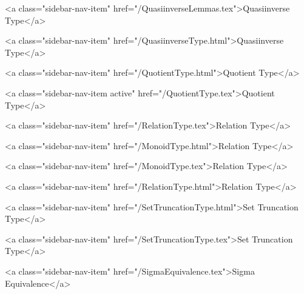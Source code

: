       
    
      
        
          <a class="sidebar-nav-item" href="/QuasiinverseLemmas.tex">Quasiinverse Type</a>
        
      
    
      
        
          <a class="sidebar-nav-item" href="/QuasiinverseType.html">Quasiinverse Type</a>
        
      
    
      
        
          <a class="sidebar-nav-item" href="/QuotientType.html">Quotient Type</a>
        
      
    
      
        
          <a class="sidebar-nav-item active" href="/QuotientType.tex">Quotient Type</a>
        
      
    
      
        
          <a class="sidebar-nav-item" href="/RelationType.tex">Relation Type</a>
        
      
    
      
        
          <a class="sidebar-nav-item" href="/MonoidType.html">Relation Type</a>
        
      
    
      
        
          <a class="sidebar-nav-item" href="/MonoidType.tex">Relation Type</a>
        
      
    
      
        
          <a class="sidebar-nav-item" href="/RelationType.html">Relation Type</a>
        
      
    
      
        
          <a class="sidebar-nav-item" href="/SetTruncationType.html">Set Truncation Type</a>
        
      
    
      
        
          <a class="sidebar-nav-item" href="/SetTruncationType.tex">Set Truncation Type</a>
        
      
    
      
        
          <a class="sidebar-nav-item" href="/SigmaEquivalence.tex">Sigma Equivalence</a>
        
